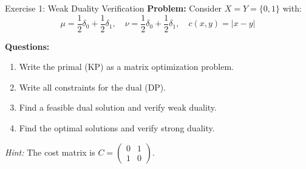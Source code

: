 \documentclass[aspectratio=169]{beamer}
\begin{document}
\begin{frame}{Exercise 1: Weak Duality Verification}
\textbf{Problem:} Consider $X = Y = \{0, 1\}$ with:
\[
\mu = \frac{1}{2}\delta_0 + \frac{1}{2}\delta_1, \quad \nu = \frac{1}{2}\delta_0 + \frac{1}{2}\delta_1, \quad c(x,y) = |x-y|
\]

\vspace{0.3cm}
\textbf{Questions:}
\begin{enumerate}
    \item[(a)] Write the primal (KP) as a matrix optimization problem.
    \item[(b)] Write all constraints for the dual (DP).
    \item[(c)] Find a feasible dual solution and verify weak duality.
    \item[(d)] Find the optimal solutions and verify strong duality.
\end{enumerate}

\vspace{0.3cm}
\textit{Hint:} The cost matrix is $C = \begin{pmatrix} 0 & 1 \\ 1 & 0 \end{pmatrix}$.
\end{frame}
\end{document}
